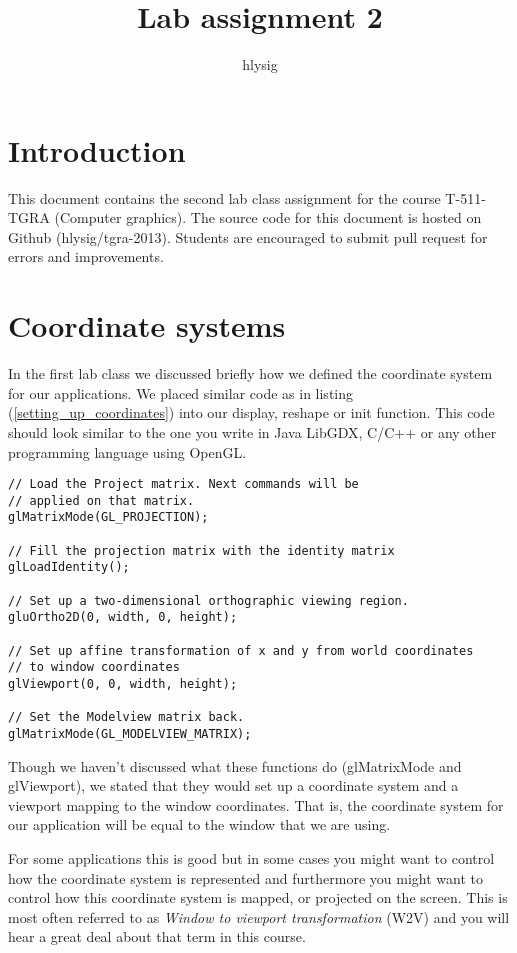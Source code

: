 \documentclass[11pt,a4paper]{article}
\begin{document}
\title{\textbf{Lab assignment 2}}
\author{hlysig}
\date{}
\maketitle
\section{Introduction}
This document contains the second lab class assignment for the course
T-511-TGRA (Computer graphics). The source code for this document is hosted on
Github (hlysig/tgra-2013). Students are encouraged to submit pull request for
errors and improvements.

\section{Coordinate systems}
In the first lab class we discussed briefly how we defined the coordinate
system for our applications. We placed similar code as in listing
(\ref{setting_up_coordinates}) into our display, reshape or init function.
This code should look similar to the one you write in Java LibGDX, C/C++ or any
other programming language using OpenGL.

\begin{lstlisting}[caption=Setting up the coordinat system from first lab class, label=setting_up_coordinates]
// Load the Project matrix. Next commands will be 
// applied on that matrix.
glMatrixMode(GL_PROJECTION);

// Fill the projection matrix with the identity matrix
glLoadIdentity();

// Set up a two-dimensional orthographic viewing region.
gluOrtho2D(0, width, 0, height);

// Set up affine transformation of x and y from world coordinates 
// to window coordinates
glViewport(0, 0, width, height);

// Set the Modelview matrix back.
glMatrixMode(GL_MODELVIEW_MATRIX); 
\end{lstlisting}

Though we haven't discussed what these functions do (glMatrixMode and
glViewport), we stated that they would set up a coordinate system and a
viewport mapping to the window coordinates. That is, the coordinate system for
our application will be equal to the window that we are using.

For some applications this is good but in some cases you might want to control how
the coordinate system is represented and furthermore you might want to control
how this coordinate system is mapped, or projected on the screen. This is most often
referred to as \emph{Window to viewport transformation} (W2V) and you will hear a great deal
about that term in this course.
\end{document}
